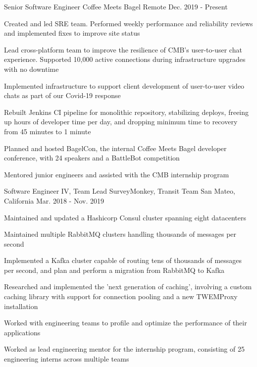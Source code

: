 \begin{cventries}
  \cventry
    {Senior Software Engineer}
    {Coffee Meets Bagel}
    {Remote}
    {Dec. 2019 - Present}
    {
        \begin{cvitems}
          \item {Created and led SRE team. Performed weekly performance and reliability reviews and implemented fixes to improve site status}
          \item {Lead cross-platform team to improve the resilience of CMB's user-to-user chat experience. Supported 10,000 active connections during infrastructure upgrades with no downtime}
          \item {Implemented infrastructure to support client development of user-to-user video chats as part of our Covid-19 response}
          \item {Rebuilt Jenkins CI pipeline for monolithic repository, stabilizing deploys, freeing up hours of developer time per day, and dropping minimum time to recovery from 45 minutes to 1 minute}
          \item {Planned and hosted BagelCon, the internal Coffee Meets Bagel developer conference, with 24 speakers and a BattleBot competition}
          \item {Mentored junior engineers and assisted with the CMB internship program}
        \end{cvitems}
    }
  \cventry
    {Software Engineer IV, Team Lead}
    {SurveyMonkey, Transit Team}
    {San Mateo, California}
    {Mar. 2018 - Nov. 2019}
    {
      \begin{cvitems}
        \item {Maintained and updated a Hashicorp Consul cluster spanning eight datacenters}
        \item {Maintained multiple RabbitMQ clusters handling thousands of messages per second}
        \item {Implemented a Kafka cluster capable of routing tens of thousands of messages per second, and plan and perform a migration from RabbitMQ to Kafka}
        \item {Researched and implemented the 'next generation of caching', involving a custom caching library with support for connection pooling and a new TWEMProxy installation}
        \item {Worked with engineering teams to profile and optimize the performance of their applications}
        \item {Worked as lead engineering mentor for the internship program, consisting of 25 engineering interns across multiple teams}

\end{cvitems}}
\end{cventries}
